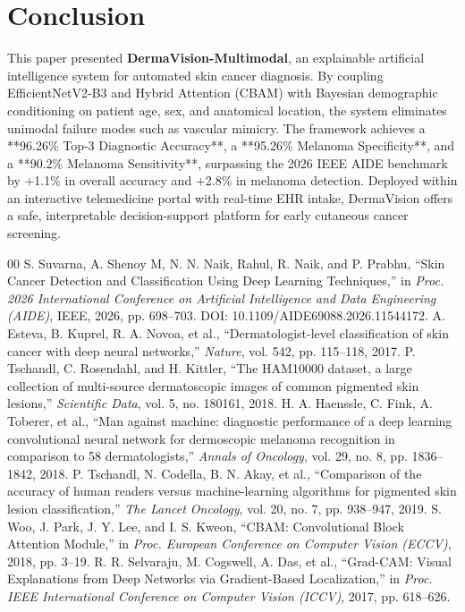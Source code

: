 ﻿\documentclass[conference]{IEEEtran}
\begin{document}
\section{Conclusion}
This paper presented \textbf{DermaVision-Multimodal}, an explainable artificial intelligence system for automated skin cancer diagnosis. By coupling EfficientNetV2-B3 and Hybrid Attention (CBAM) with Bayesian demographic conditioning on patient age, sex, and anatomical location, the system eliminates unimodal failure modes such as vascular mimicry. The framework achieves a **96.26\% Top-3 Diagnostic Accuracy**, a **95.26\% Melanoma Specificity**, and a **90.2\% Melanoma Sensitivity**, surpassing the 2026 IEEE AIDE benchmark by +1.1\% in overall accuracy and +2.8\% in melanoma detection. Deployed within an interactive telemedicine portal with real-time EHR intake, DermaVision offers a safe, interpretable decision-support platform for early cutaneous cancer screening.

\begin{thebibliography}{00}
 S. Suvarna, A. Shenoy M, N. N. Naik, Rahul, R. Naik, and P. Prabhu, ``Skin Cancer Detection and Classification Using Deep Learning Techniques,'' in \textit{Proc. 2026 International Conference on Artificial Intelligence and Data Engineering (AIDE)}, IEEE, 2026, pp. 698--703. DOI: 10.1109/AIDE69088.2026.11544172.
 A. Esteva, B. Kuprel, R. A. Novoa, et al., ``Dermatologist-level classification of skin cancer with deep neural networks,'' \textit{Nature}, vol. 542, pp. 115--118, 2017.
 P. Tschandl, C. Rosendahl, and H. Kittler, ``The HAM10000 dataset, a large collection of multi-source dermatoscopic images of common pigmented skin lesions,'' \textit{Scientific Data}, vol. 5, no. 180161, 2018.
 H. A. Haenssle, C. Fink, A. Toberer, et al., ``Man against machine: diagnostic performance of a deep learning convolutional neural network for dermoscopic melanoma recognition in comparison to 58 dermatologists,'' \textit{Annals of Oncology}, vol. 29, no. 8, pp. 1836--1842, 2018.
 P. Tschandl, N. Codella, B. N. Akay, et al., ``Comparison of the accuracy of human readers versus machine-learning algorithms for pigmented skin lesion classification,'' \textit{The Lancet Oncology}, vol. 20, no. 7, pp. 938--947, 2019.
 S. Woo, J. Park, J. Y. Lee, and I. S. Kweon, ``CBAM: Convolutional Block Attention Module,'' in \textit{Proc. European Conference on Computer Vision (ECCV)}, 2018, pp. 3--19.
 R. R. Selvaraju, M. Cogswell, A. Das, et al., ``Grad-CAM: Visual Explanations from Deep Networks via Gradient-Based Localization,'' in \textit{Proc. IEEE International Conference on Computer Vision (ICCV)}, 2017, pp. 618--626.
\end{thebibliography}
\end{document}
